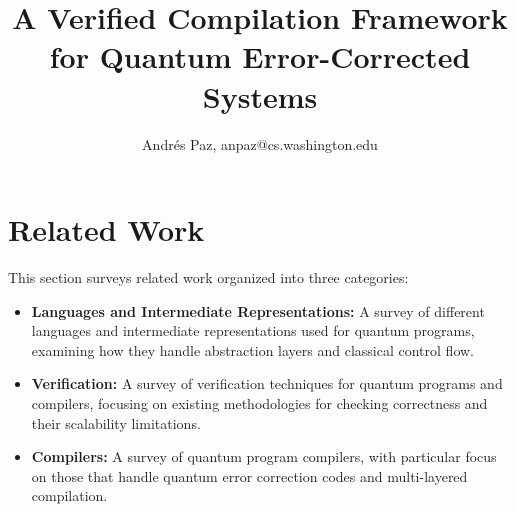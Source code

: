 \documentclass[DIV=15]{scrartcl}
\title{A Verified Compilation Framework for Quantum Error-Corrected Systems}
\author{Andrés Paz, anpaz@cs.washington.edu}
\renewcommand{\`}[1]{\texttt{#1}}
\begin{document}
\maketitle





\section{Related Work}

This section surveys related work organized into three categories:

\begin{itemize}
\item \textbf{Languages and Intermediate Representations:} A survey of different languages and intermediate representations used for quantum programs, examining how they handle abstraction layers and classical control flow.
\item \textbf{Verification:} A survey of verification techniques for quantum programs and compilers, focusing on existing methodologies for checking correctness and their scalability limitations.
\item \textbf{Compilers:} A survey of quantum program compilers, with particular focus on those that handle quantum error correction codes and multi-layered compilation.
\end{itemize}











\end{document}
